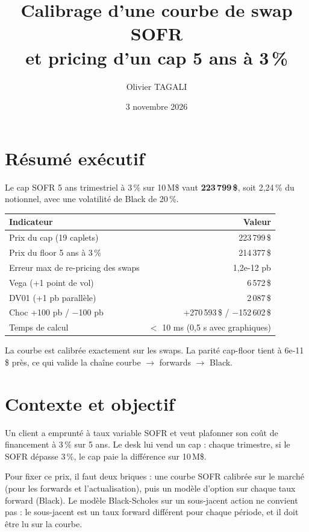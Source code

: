 \documentclass[11pt,a4paper]{article}
\title{Calibrage d'une courbe de swap SOFR\\et pricing d'un cap 5 ans à 3\,\%}
\author{Olivier TAGALI}
\date{3 novembre 2026}
\begin{document}
\maketitle

\section{Résumé exécutif}
Le cap SOFR 5 ans trimestriel à 3\,\% sur 10\,M\$ vaut \textbf{223\,799\,\$}, soit 2,24\,\% du notionnel, avec une volatilité de Black de 20\,\%.

\begin{table}[H]
\centering
\begin{tabular}{lr}
\toprule
Indicateur & Valeur \\
\midrule
Prix du cap (19 caplets) & 223\,799\,\$ \\
Prix du floor 5 ans à 3\,\% & 214\,377\,\$ \\
Erreur max de re-pricing des swaps & 1,2e-12 pb \\
Vega (+1 point de vol) & 6\,572\,\$ \\
DV01 (+1 pb parallèle) & 2\,087\,\$ \\
Choc +100 pb / $-$100 pb & +270\,593\,\$ / $-$152\,602\,\$ \\
Temps de calcul & $<$ 10 ms (0,5 s avec graphiques) \\
\bottomrule
\end{tabular}
\end{table}

La courbe est calibrée exactement sur les swaps. La parité cap-floor tient à 6e-11\,\$ près, ce qui valide la chaîne courbe $\rightarrow$ forwards $\rightarrow$ Black.

\section{Contexte et objectif}
Un client a emprunté à taux variable SOFR et veut plafonner son coût de financement à 3\,\% sur 5 ans. Le desk lui vend un cap : chaque trimestre, si le SOFR dépasse 3\,\%, le cap paie la différence sur 10\,M\$.

Pour fixer ce prix, il faut deux briques : une courbe SOFR calibrée sur le marché (pour les forwards et l'actualisation), puis un modèle d'option sur chaque taux forward (Black). Le modèle Black-Scholes sur un sous-jacent action ne convient pas : le sous-jacent est un taux forward différent pour chaque période, et il doit être lu sur la courbe.
\end{document}
